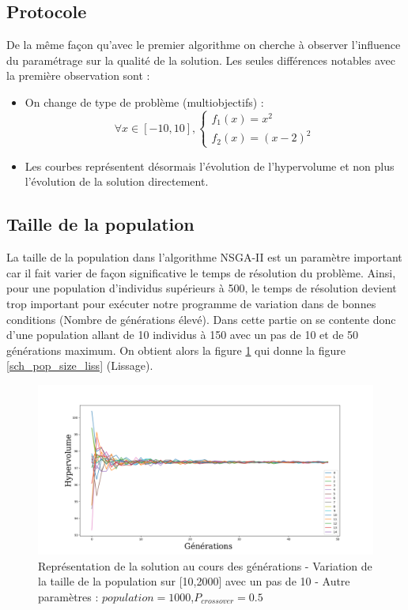 \documentclass[12pt]{report}
\begin{document}
      \subsection{Protocole}

      De la même façon qu'avec le premier algorithme on cherche à observer l'influence du paramétrage sur la qualité de la solution. Les seules différences notables avec la première observation sont :
      \begin{itemize}
        \item On change de type de problème (multiobjectifs) :
        $$
        \forall x \in [-10,10],
        \left\{
          \begin{array}{ll}
             f_1(x) = x^2 \\
             f_2(x) = (x-2)^2
          \end{array}
        \right.
        $$
        \item Les courbes représentent désormais l'évolution de l'hypervolume et non plus l'évolution de la solution directement.
      \end{itemize}


      \subsection{Taille de la population}
      La taille de la population dans l'algorithme NSGA-II est un paramètre important car il fait varier de façon significative le temps de résolution du problème. Ainsi, pour une population d'individus supérieurs à 500, le temps de résolution devient trop important pour exécuter notre programme de variation dans de bonnes conditions (Nombre de générations élevé). Dans cette partie on se contente donc d'une population allant de 10 individus à 150 avec un pas de 10 et de 50 générations maximum. On obtient alors la figure \ref{sch_pop_size_moy} qui donne la figure \ref{sch_pop_size_liss} (Lissage).

      \begin{figure}[h]
        \centering
        \includegraphics[width=18cm]{img/pop_size_sch_moy.png}
        \caption{Représentation de la solution au cours des générations - Variation de la taille de la population sur [10,2000] avec un pas de 10 - Autre paramètres : $population = 1000$,$P_{crossover} = 0.5$}
        \label{sch_pop_size_moy}
      \end{figure}
\end{document}
